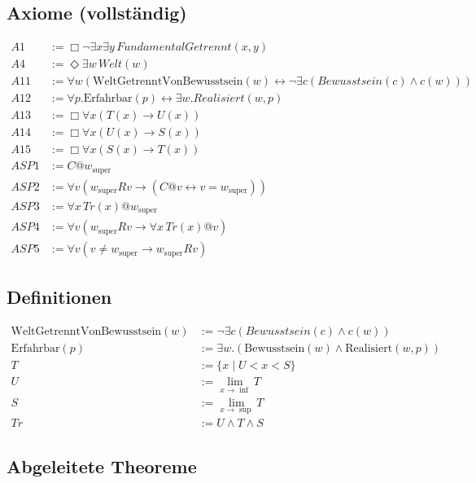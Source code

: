 \documentclass[
]{article}
\begin{document}
\subsection{Axiome (vollständig)}

\[
\begin{aligned}
A1 &:= \Box\neg\exists x\exists y\, FundamentalGetrennt(x,y) \\
A4 &:= \Diamond\exists w\, Welt(w) \\
A11 &:= \forall w \left( \text{WeltGetrenntVonBewusstsein}(w) \leftrightarrow \neg \exists c (Bewusstsein(c) \land c(w)) \right) \\
A12 &:= \forall p. \text{Erfahrbar}(p) \leftrightarrow \exists w. Realisiert(w, p) \\
A13 &:= \Box\forall x(T(x) \rightarrow U(x)) \\
A14 &:= \Box\forall x(U(x) \rightarrow S(x)) \\
A15 &:= \Box\forall x(S(x) \rightarrow T(x)) \\
ASP1 &:= C @ w_{\text{super}} \\
ASP2 &:= \forall v (w_{\text{super}} R v \rightarrow (C @ v \leftrightarrow v = w_{\text{super}})) \\
ASP3 &:= \forall x\,Tr(x) @ w_{\text{super}} \\
ASP4 &:= \forall v (w_{\text{super}} R v \rightarrow \forall x\,Tr(x) @ v) \\
ASP5 &:= \forall v (v \neq w_{\text{super}} \rightarrow w_{\text{super}} R v)
\end{aligned}
\]

\subsection{Definitionen}

\[
\begin{aligned}
\text{WeltGetrenntVonBewusstsein}(w) &:= \neg \exists c (Bewusstsein(c) \land c(w)) \\
\text{Erfahrbar}(p) &:= \exists w. (\text{Bewusstsein}(w) \land \text{Realisiert}(w, p)) \\
T &:= \{ x \mid U < x < S \} \\
U &:= \lim_{x \to \inf} T \\
S &:= \lim_{x \to \sup} T \\
Tr &:= U \land T \land S
\end{aligned}
\]

\subsection{Abgeleitete Theoreme}
\end{document}
